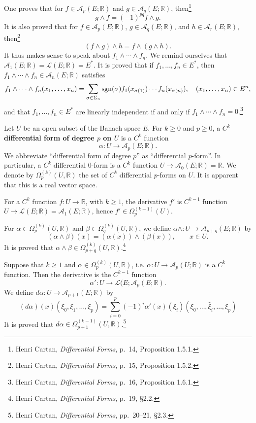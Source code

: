 \documentclass{article}
\newcommand{\sgn}{\ensuremath\mathrm{sgn}}
\theoremstyle{definition}
\theoremstyle{definition}
\begin{document}
One proves that for $f \in \mathscr{A}_p(E;\mathbb{R})$ and $g \in \mathscr{A}_q(E;\mathbb{R})$,
then\footnote{Henri Cartan,
{\em Differential Forms}, p.~14, Proposition 1.5.1.}
\[
g \wedge f = (-1)^{pq} f \wedge g.
\]
It is also proved that for $f \in \mathscr{A}_p(E;\mathbb{R})$, 
$g \in \mathscr{A}_q(E;\mathbb{R})$, and
$h \in \mathscr{A}_r(E;\mathbb{R})$, then\footnote{Henri Cartan,
{\em Differential Forms}, p.~15, Proposition 1.5.2.}
\[
(f \wedge g) \wedge h = f \wedge (g \wedge h).
\]
It thus makes sense to speak about $f_1 \wedge  \cdots \wedge f_n$. 
We remind ourselves that $\mathscr{A}_1(E;\mathbb{R})=\mathscr{L}(E;\mathbb{R})=E^*$.
It is proved that if $f_1,\ldots,f_n \in E^*$, then $f_1 \wedge \cdots \wedge f_n
\in \mathscr{A}_n(E;\mathbb{R})$ satisfies
\[
f_1 \wedge \cdots \wedge f_n (x_1,\ldots,x_n) = \sum_{\sigma \in \Sigma_n}
\sgn(\sigma) f_1(x_{\sigma(1)}) \cdots f_n(x_{\sigma(n)}),
\quad (x_1,\ldots,x_n) \in E^n,
\]
and that $f_1,\ldots,f_n \in E^*$ are linearly independent if and only if
$f_1 \wedge \cdots \wedge f_n=0$.\footnote{Henri Cartan,
{\em Differential Forms}, p.~16, Proposition 1.6.1.}


Let $U$ be an open subset of the Banach space $E$. 
For $k \geq 0$ and $p \geq 0$, a \textbf{$C^k$ differential form of degree $p$ on $U$}
is a $C^k$ function
\[
\alpha: U \to \mathscr{A}_p(E;\mathbb{R}). 
\]
We abbreviate ``differential form of degree $p$'' as ``differential $p$-form''.
In particular, a $C^k$ differential $0$-form is a $C^k$ function $U \to \mathscr{A}_0(E;\mathbb{R})
=\mathbb{R}$.
We denote by $\Omega_p^{(k)}(U,\mathbb{R})$ the set of $C^k$ differential
$p$-forms on $U$. It is apparent that this is a real vector space. 

For a $C^k$ function $f:U \to \mathbb{R}$, with $k \geq 1$,
the derivative $f'$ is $C^{k-1}$ function
$U \to \mathscr{L}(E;\mathbb{R})=\mathscr{A}_1(E;\mathbb{R})$, hence
$f' \in \Omega_p^{(k-1)}(U)$. 

For $\alpha \in \Omega_p^{(k)}(U,\mathbb{R})$ and 
$\beta \in \Omega_q^{(k)}(U,\mathbb{R})$, we define
$\alpha \wedge:U \to \mathscr{A}_{p+q}(E;\mathbb{R})$ by
\[
(\alpha \wedge \beta)(x) = (\alpha(x)) \wedge (\beta(x)), \qquad x \in U.
\]
It is proved that $\alpha \wedge \beta \in \Omega_{p+q}^{(k)}(U,\mathbb{R})$.\footnote{Henri Cartan,
{\em Differential Forms}, p.~19, \S 2.2.}

Suppose that $k \geq 1$ and $\alpha \in \Omega_p^{(k)}(U,\mathbb{R})$, i.e.
$\alpha:U \to \mathscr{A}_p(U;\mathbb{R})$ is a $C^k$ function. Then
the derivative is the $C^{k-1}$ function
\[
\alpha':U \to \mathscr{L}(E;\mathscr{A}_p(E;\mathbb{R}).
\]
We define $d\alpha:U \to \mathscr{A}_{p+1}(E;\mathbb{R})$ by
\[
(d\alpha)(x)(\xi_0,\xi_1,\ldots,\xi_p)
=\sum_{i=0}^p (-1)^i \alpha'(x)(\xi_i)(\xi_0,\ldots,\hat{\xi}_i,\ldots,\xi_p)
\]
It is proved that $d\alpha \in \Omega_{p+1}^{(k-1)}(U,\mathbb{R})$.\footnote{Henri Cartan,
{\em Differential Forms}, pp.~20--21, \S 2.3.}
\end{document}
